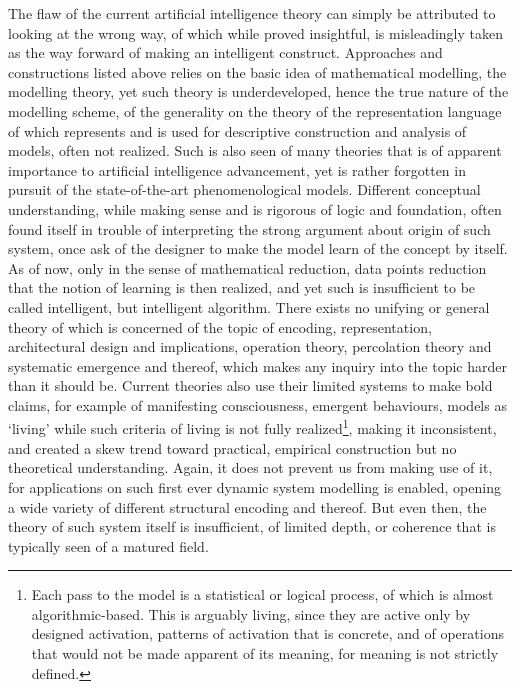The flaw of the current artificial intelligence theory can simply be attributed to looking at the wrong way, of which while proved insightful, is misleadingly taken as the way forward of making an intelligent construct. Approaches and constructions listed above relies on the basic idea of mathematical modelling, the modelling theory, yet such theory is underdeveloped, hence the true nature of the modelling scheme, of the generality on the theory of the representation language of which represents and is used for descriptive construction and analysis of models, often not realized. Such is also seen of many theories that is of apparent importance to artificial intelligence advancement, yet is rather forgotten in pursuit of the state-of-the-art phenomenological models. Different conceptual understanding, while making sense and is rigorous of logic and foundation, often found itself in trouble of interpreting the strong argument about origin of such system, once ask of the designer to make the model learn of the concept by itself. As of now, only in the sense of mathematical reduction, data points reduction that the notion of learning is then realized, and yet such is insufficient to be called intelligent, but intelligent algorithm. There exists no unifying or general theory of which is concerned of the topic of encoding, representation, architectural design and implications, operation theory, percolation theory and systematic emergence and thereof, which makes any inquiry into the topic harder than it should be. Current theories also use their limited systems to make bold claims, for example of manifesting consciousness, emergent behaviours, models as `living' while such criteria of living is not fully realized\footnote{Each pass to the model is a statistical or logical process, of which is almost algorithmic-based. This is arguably living, since they are active only by designed activation, patterns of activation that is concrete, and of operations that would not be made apparent of its meaning, for meaning is not strictly defined.}, making it inconsistent, and created a skew trend toward practical, empirical construction but no theoretical understanding. Again, it does not prevent us from making use of it, for applications on such first ever dynamic system modelling is enabled, opening a wide variety of different structural encoding and thereof. But even then, the theory of such system itself is insufficient, of limited depth, or coherence that is typically seen of a matured field. 

